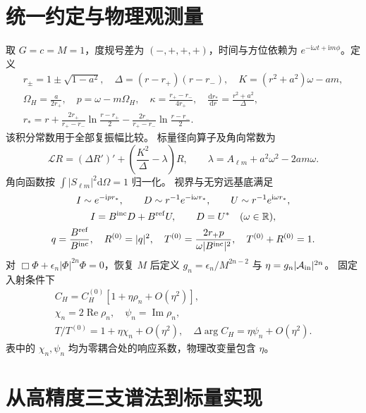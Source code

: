 \documentclass[UTF8,fontset=fandol,11pt,a4paper]{ctexart}
\newcommand{\ii}{\mathrm{i}}\newcommand{\dd}{\mathrm{d}}
\newcommand{\Rea}{\operatorname{Re}}\newcommand{\Ima}{\operatorname{Im}}
\numberwithin{equation}{section}
\begin{document}
\section{统一约定与物理观测量}
取 $G=c=M=1$，度规号差为 $(-,+,+,+)$，时间与方位依赖为
$e^{-\ii\omega t+\ii m\phi}$。定义
\begin{gather}
r_\pm=1\pm\sqrt{1-a^2},\quad\Delta=(r-r_+)(r-r_-),\quad
K=(r^2+a^2)\omega-am,\\
\Omega_H=\frac{a}{2r_+},\quad p=\omega-m\Omega_H,\quad
\kappa=\frac{r_+-r_-}{4r_+},\quad \frac{\dd r_*}{\dd r}=\frac{r^2+a^2}{\Delta},\\
r_*=r+\frac{2r_+}{r_+-r_-}\ln\frac{r-r_+}{2}
-\frac{2r_-}{r_+-r_-}\ln\frac{r-r_-}{2}.
\end{gather}
该积分常数用于全部复振幅比较。
标量径向算子及角向常数为
\begin{equation}
\mathcal L R=(\Delta R')'+\left(\frac{K^2}{\Delta}-\lambda\right)R,
\qquad\lambda=A_{\ell m}+a^2\omega^2-2am\omega.
\end{equation}
角向函数按 $\int|S_{\ell m}|^2\dd\Omega=1$ 归一化。
视界与无穷远基底满足
\begin{gather}
I\sim e^{-\ii p r_*},\qquad D\sim r^{-1}e^{-\ii\omega r_*},\qquad
U\sim r^{-1}e^{\ii\omega r_*},\\
I=B^{\rm inc}D+B^{\rm ref}U,\qquad D=U^*\quad(\omega\in\mathbb R),\\
q=\frac{B^{\rm ref}}{B^{\rm inc}},\quad R^{(0)}=|q|^2,\quad
T^{(0)}=\frac{2r_+p}{\omega|B^{\rm inc}|^2},\quad T^{(0)}+R^{(0)}=1.
\end{gather}
对 $\Box\Phi+\epsilon_n|\Phi|^{2n}\Phi=0$，恢复 $M$ 后定义
$g_n=\epsilon_n/M^{2n-2}$ 与 $\eta=g_n|\mathcal A_{\rm in}|^{2n}$。
固定入射条件下
\begin{gather}
C_H=C_H^{(0)}[1+\eta\rho_n+O(\eta^2)],\\
\chi_n=2\Rea\rho_n,\quad\psi_n=\Ima\rho_n,\\
T/T^{(0)}=1+\eta\chi_n+O(\eta^2),\quad
\Delta\arg C_H=\eta\psi_n+O(\eta^2).
\end{gather}
表中的 $\chi_n,\psi_n$ 均为零耦合处的响应系数，物理改变量包含 $\eta$。

\section{从高精度三支谱法到标量实现}
\end{document}
